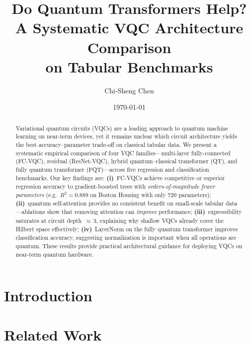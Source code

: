 \documentclass[twocolumn,prl,amsmath,amssymb,superscriptaddress]{revtex4-2}
\begin{document}
\title{Do Quantum Transformers Help?\\
A Systematic VQC Architecture Comparison\\
on Tabular Benchmarks}

\author{Chi-Sheng Chen}

\date{\today}

\begin{abstract}
Variational quantum circuits (VQCs) are a leading approach to quantum machine
learning on near-term devices, yet it remains unclear which circuit
architecture yields the best accuracy--parameter trade-off on classical
tabular data.  We present a systematic empirical comparison of four VQC
families---multi-layer fully-connected (FC-VQC), residual (ResNet-VQC),
hybrid quantum--classical transformer (QT), and fully quantum transformer
(FQT)---across five regression and classification benchmarks.
Our key findings are:
\textbf{(i)}~FC-VQCs achieve competitive or superior regression accuracy to
gradient-boosted trees with \emph{orders-of-magnitude fewer parameters}
(e.g.\ $R^2{=}0.889$ on Boston Housing with only 720 parameters);
\textbf{(ii)}~quantum self-attention provides no consistent benefit on
small-scale tabular data---ablations show that removing attention can
\emph{improve} performance;
\textbf{(iii)}~expressibility saturates at circuit depth~${\approx}\,3$,
explaining why shallow VQCs already cover the Hilbert space effectively;
\textbf{(iv)}~LayerNorm on the fully quantum transformer improves
classification accuracy, suggesting normalization is important when all
operations are quantum.
These results provide practical architectural guidance for deploying VQCs on
near-term quantum hardware.
\end{abstract}

\maketitle

\section{Introduction}
\label{sec:intro}


\section{Related Work}
\label{sec:related}

\end{document}
